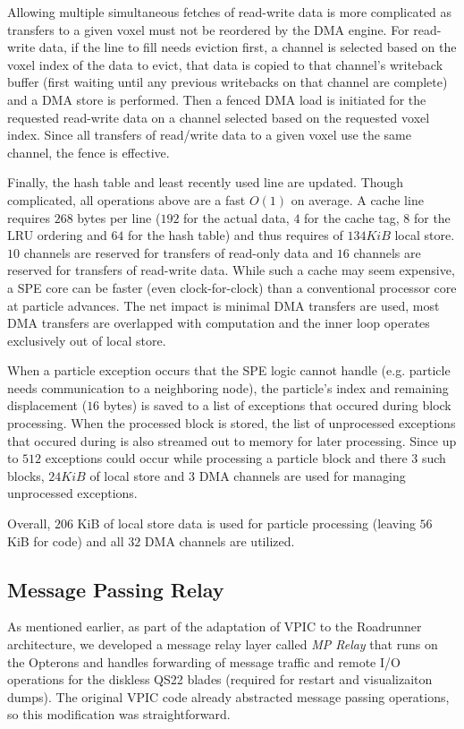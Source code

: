 \documentclass[letter,10pt]{article}
\begin{document}
Allowing multiple simultaneous fetches of read-write data is more
complicated as transfers to a given voxel must not be reordered by the
DMA engine.  For read-write data, if the line to fill needs
eviction first, a channel is selected based on the voxel index of the data
to evict, that data is copied to that channel's writeback buffer
(first waiting until any previous writebacks on that channel are
complete) and a DMA store is performed.  Then a fenced DMA load is
initiated for the requested read-write data on a channel selected
based on the requested voxel index.  Since all transfers of read/write
data to a given voxel use the same channel, the fence is effective.

Finally, the hash table and least recently used line are updated.
Though complicated, all operations above are a fast $O(1)$ on average.
A cache line requires $268$ bytes per line ($192$ for the actual data,
$4$ for the cache tag, $8$ for the LRU ordering and $64$ for the hash
table) and thus requires of $134 KiB$ local store.  $10$ channels are
reserved for transfers of read-only data and $16$ channels are
reserved for transfers of read-write data.  While such a cache may
seem expensive, a SPE core can be faster (even clock-for-clock) than a
conventional processor core at particle advances.  The net impact is
minimal DMA transfers are used, most DMA transfers are overlapped with
computation and the inner loop operates exclusively out of local store.

When a particle exception occurs that the SPE logic cannot handle
(e.g. particle needs communication to a neighboring node), the
particle's index and remaining displacement ($16$ bytes) is saved to a
list of exceptions that occured during block processing.  When
the processed block is stored, the list of unprocessed
exceptions that occured during is also streamed out to memory for
later processing.  Since up to $512$ exceptions could occur while
processing a particle block and there $3$ such blocks, $24
KiB$ of local store and $3$ DMA channels are used for managing
unprocessed exceptions.

Overall, $206$ KiB of local store data is used for particle
processing (leaving $56$ KiB for code) and all $32$ DMA channels
are utilized.

\subsection*{Message Passing Relay}

As mentioned earlier, as part of the adaptation of VPIC to the
Roadrunner architecture, we developed a message relay layer
called \emph{MP Relay}
that runs on the Opterons and handles forwarding
of message traffic and remote I/O operations for the diskless
QS22 blades (required for restart and visualizaiton dumps).
The original VPIC code already abstracted message passing
operations, so this modification was straightforward.
\end{document}
